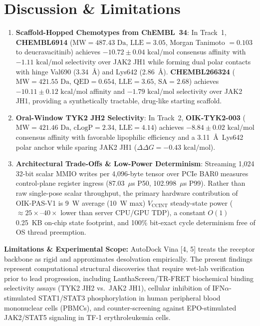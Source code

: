 \documentclass[10pt,letterpaper]{article}
\begin{document}
\section{Discussion \& Limitations}
\begin{enumerate}
    \item \textbf{Scaffold-Hopped Chemotypes from ChEMBL~34}: In Track~1, \textbf{CHEMBL6914} ($\text{MW} = 487.43\text{ Da}$, $\text{LLE} = 3.05$, Morgan Tanimoto $= 0.103$ to deucravacitinib) achieves $-10.72 \pm 0.04\text{ kcal/mol}$ consensus affinity with $-1.11\text{ kcal/mol}$ selectivity over JAK2 JH1 while forming dual polar contacts with hinge Val690 (3.34~Å) and Lys642 (2.86~Å). \textbf{CHEMBL266324} ($\text{MW} = 421.55\text{ Da}$, $\text{QED} = 0.654$, $\text{LLE} = 3.65$, $\text{SA} = 2.68$) achieves $-10.11 \pm 0.12\text{ kcal/mol}$ affinity and $-1.79\text{ kcal/mol}$ selectivity over JAK2 JH1, providing a synthetically tractable, drug-like starting scaffold.
    \item \textbf{Oral-Window TYK2 JH2 Selectivity}: In Track~2, \textbf{OIK-TYK2-003} ($\text{MW} = 421.46\text{ Da}$, $\text{cLogP} = 2.34$, $\text{LLE} = 4.14$) achieves $-8.84 \pm 0.02\text{ kcal/mol}$ consensus affinity with favorable lipophilic efficiency and a 3.11~Å\ Lys642 polar anchor while sparing JAK2 JH1 ($\Delta\Delta G = -0.43\text{ kcal/mol}$).
    \item \textbf{Architectural Trade-Offs \& Low-Power Determinism}: Streaming 1,024 32-bit scalar MMIO writes per 4,096-byte tensor over PCIe BAR0 measures control-plane register ingress (87.03~$\mu$s P50, 102.998~$\mu$s P99). Rather than raw single-pose scalar throughput, the primary hardware contribution of OIK-PAS-V1 is 9~W average (10~W max) $V_{\text{CCINT}}$ steady-state power ($\approx 25\times$--$40\times$ lower than server CPU/GPU TDP), a constant $O(1)$ 0.25~KB on-chip state footprint, and 100\% bit-exact cycle determinism free of OS thread preemption.
\end{enumerate}

\textbf{Limitations \& Experimental Scope:} AutoDock Vina [4, 5] treats the receptor backbone as rigid and approximates desolvation empirically. The present findings represent computational structural discoveries that require wet-lab verification prior to lead progression, including LanthaScreen/TR-FRET biochemical binding selectivity assays (TYK2 JH2 vs.\ JAK2 JH1), cellular inhibition of IFN$\alpha$-stimulated STAT1/STAT3 phosphorylation in human peripheral blood mononuclear cells (PBMCs), and counter-screening against EPO-stimulated JAK2/STAT5 signaling in TF-1 erythroleukemia cells.
\end{document}
